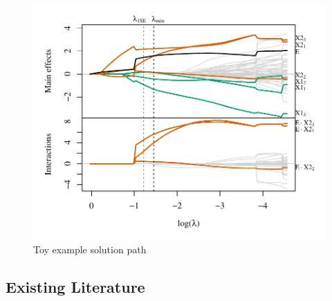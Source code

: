 \documentclass[12pt,letter]{article}\usepackage[]{graphicx}\usepackage[]{color}
\newenvironment{knitrout}{}{} %
\begin{document}
\begin{knitrout}\scriptsize
{}\color{fgcolor}\begin{figure}

{\centering \includegraphics[width=1\linewidth]{figure/toy-solution-path-1} 

}

\caption[Toy example solution path]{Toy example solution path}\label{fig:toy-solution-path}
\end{figure}


\end{knitrout}




\subsection{Existing Literature}
\end{document}
